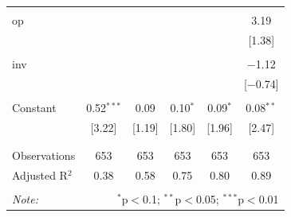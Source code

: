 \documentclass[12pt]{article}
\begin{document}
\begin{table}[!htbp]
\begin{tabular}{@{\extracolsep{5pt}}lccccc}
  & & & & & \\ 
 op &  &  &  &  & 3.19 \\ 
  &  &  &  &  & [1.38] \\ 
  & & & & & \\ 
 inv &  &  &  &  & $-$1.12 \\ 
  &  &  &  &  & [$-$0.74] \\ 
  & & & & & \\ 
 Constant & 0.52$^{***}$ & 0.09 & 0.10$^{*}$ & 0.09$^{*}$ & 0.08$^{**}$ \\ 
  & [3.22] & [1.19] & [1.80] & [1.96] & [2.47] \\ 
  & & & & & \\ 
\hline \\[-1.8ex] 
Observations & 653 & 653 & 653 & 653 & 653 \\ 
Adjusted R$^{2}$ & 0.38 & 0.58 & 0.75 & 0.80 & 0.89 \\ 
\hline 
\hline \\[-1.8ex] 
\textit{Note:}  & \multicolumn{5}{r}{$^{*}$p$<$0.1; $^{**}$p$<$0.05; $^{***}$p$<$0.01} \\ 
\end{tabular}
\end{table} 



\clearpage
\end{document}
